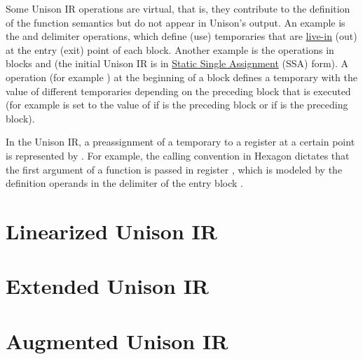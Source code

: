 \documentclass[11pt]{report}
\newenvironment{colorBox}[1]
 {\begin{tcolorbox}[
    breakable,
    colback=#1,
    colframe=white,
    boxrule=0pt
  ]}
 {\end{tcolorbox}}
\newenvironment{codeBox}
 {\begin{colorBox}{bgcolor4!20}}
 {\end{colorBox}}
\begin{document}
Some Unison IR operations are virtual, that is, they contribute to the
definition of the function semantics but do not appear in Unison's output.
%
An example is the  and  delimiter operations, which define
(use) temporaries that are
\href{https://en.wikipedia.org/wiki/Live_variable_analysis}{live-in} (out) at
the entry (exit) point of each block.
%
Another example is the  operations in blocks  and 
(the initial Unison IR is in
\href{https://en.wikipedia.org/wiki/Static_single_assignment_form}{Static Single
  Assignment} (SSA) form).
%
A  operation (for example ) at the beginning of a block
defines a temporary with the value of different temporaries depending on the
preceding block that is executed (for example  is set to the value of
 if  is the preceding block or  if  is the
preceding block).

In the Unison IR, a preassignment of a temporary  to a register 
at a certain point is represented by .
%
For example, the calling convention in Hexagon dictates that the first argument
of a function is passed in register , which is modeled by the
definition operands  in the  delimiter of the entry block
.

\section{Linearized Unison IR}\label{sec:lssa}

\begin{codeBox}
\end{codeBox}

\section{Extended Unison IR}

\begin{codeBox}
\end{codeBox}

\section{Augmented Unison IR}

\begin{codeBox}
\end{codeBox}
\end{document}
